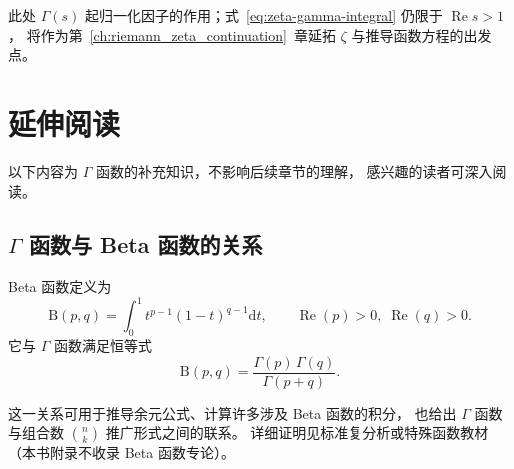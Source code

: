 此处 $\Gamma(s)$ 起归一化因子的作用；式~\eqref{eq:zeta-gamma-integral} 仍限于 $\operatorname{Re}s>1$，
将作为第~\ref{ch:riemann_zeta_continuation}~章延拓 $\zeta$ 与推导函数方程的出发点。

\section*{延伸阅读}

以下内容为 $\Gamma$ 函数的补充知识，不影响后续章节的理解，
感兴趣的读者可深入阅读。

\subsection*{$\Gamma$ 函数与 Beta 函数的关系}

Beta 函数定义为
\[
\mathrm{B}(p, q) = \int_0^1 t^{p-1} (1-t)^{q-1}\mathrm{d} t, \qquad \operatorname{Re}(p)>0,\; \operatorname{Re}(q)>0.
\]
它与 $\Gamma$ 函数满足恒等式
\[
\mathrm{B}(p, q) = \frac{\Gamma(p)\,\Gamma(q)}{\Gamma(p+q)}.
\]

这一关系可用于推导余元公式、计算许多涉及 Beta 函数的积分，
也给出 $\Gamma$ 函数与组合数 $\binom{n}{k}$ 推广形式之间的联系。
详细证明见标准复分析或特殊函数教材（本书附录不收录 Beta 函数专论）。

\begin{center}
\end{center}

